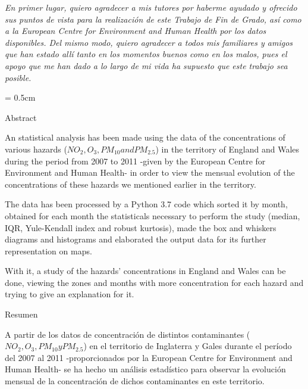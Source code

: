 \documentclass[12pt]{article}
\begin{document}
\newpage
\vspace{10cm}
\newpage

\begin{minipage}[]{20cm}
\vspace{10cm}
\end{minipage}


\begin{flushright}
\normalsize \textit{En primer lugar, quiero agradecer a mis tutores por haberme ayudado y ofrecido sus puntos de vista para la realización de este Trabajo de Fin de Grado, así como a la European Centre for Environment and Human Health por los datos disponibles. Del mismo modo, quiero agradecer a todos mis familiares y amigos que han estado allí tanto en los momentos buenos como en los malos, pues el apoyo que me han dado a lo largo de mi vida ha supuesto que este trabajo sea posible.}
\end{flushright}

\parskip = 0.5cm
\newpage
{}
\setcounter{page}{1}
\tableofcontents
\newpage

\Huge Abstract
%

\normalsize An statistical analysis has been made using the data of the concentrations of various hazards ($NO_2, O_3, PM_{10} and PM_{2.5}$) in the territory of England and Wales during the period from 2007 to 2011 -given by the European Centre for Environment and Human Health- in order to view the mensual evolution of the concentrations of these hazards we mentioned earlier in the territory.

The data has been processed by a Python 3.7 code which sorted it by month, obtained for each month the statisticals necessary to perform the study (median, IQR, Yule-Kendall index and robust kurtosis), made the box and whiskers diagrams and histograms and elaborated the output data for its further representation on maps.

With it, a study of the hazards' concentrations in England and Wales can be done, viewing the zones and months with more concentration for each hazard and trying to give an explanation for it.

\vspace{0.5cm}

\Huge Resumen

\normalsize A partir de los datos de concentración de distintos contaminantes ($NO_2, O_3, PM_{10} y PM_{2.5}$) en el territorio de Inglaterra y Gales durante el período del 2007 al 2011 -proporcionados por la European Centre for Environment and Human Health- se ha hecho un análisis estadístico para observar la evolución mensual de la concentración de dichos contaminantes en este territorio.
\end{document}
